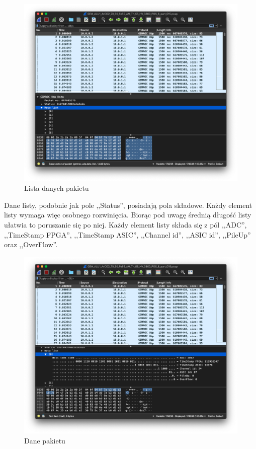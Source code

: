\documentclass[a4paper, 11pt, twoside, openright]{article}
\begin{document}
		\begin{figure}[h]
			\centering
				\includegraphics[width=1.0\textwidth]{img/screenshot_dissector_data_list.png}
			\caption{Lista danych pakietu}
			\label{fig:dis_data_list}
		\end{figure}

	Dane listy, podobnie jak pole ,,Status'', posiadają pola składowe. Każdy element listy wymaga więc osobnego rozwinięcia. Biorąc pod uwagę średnią długość
	listy ułatwia to poruszanie się po niej. Każdy element listy składa się z pól ,,ADC'', ,,TimeStamp FPGA'', ,,TimeStamp ASIC'', ,,Channel id'', ,,ASIC id'',
	,,PileUp'' oraz ,,OverFlow''.

		\begin{figure}[h]
			\centering
				\includegraphics[width=1.0\textwidth]{img/screenshot_dissector_data.png}
			\caption{Dane pakietu}
			\label{fig:dis_data}
		\end{figure}
\end{document}
